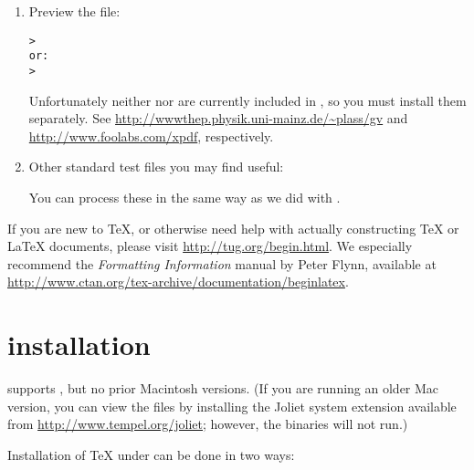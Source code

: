 \documentclass{article}
\begin{document}
\begin{enumerate}
\item Preview the  file:
\begin{alltt}
> 
\textrm{or:}
> 
\end{alltt}
Unfortunately neither  nor  are currently
included in \TL{}, so you must install them separately.  See
\url{http://wwwthep.physik.uni-mainz.de/~plass/gv} and
\url{http://www.foolabs.com/xpdf}, respectively.

\item Other standard test files you may find useful:

You can process these in the same way as we did with
.

\end{enumerate}

If you are new to \TeX{}, or otherwise need help with actually
constructing \TeX{} or \LaTeX{} documents, please visit
\url{http://tug.org/begin.html}.  We especially recommend the
\textsl{Formatting Information} manual by Peter Flynn, available at
\url{http://www.ctan.org/tex-archive/documentation/beginlatex}.


\section{\MacOSX{} installation}
\label{sec:mac-install}

\TL{} supports \MacOSX, but no prior Macintosh versions.  (If you
are running an older Mac version, you can view the files by installing
the Joliet system extension available from
\url{http://www.tempel.org/joliet}; however, the \TL{} binaries
will not run.)

Installation of \TeX{} under \MacOSX{} can be done in two ways:
\end{document}
